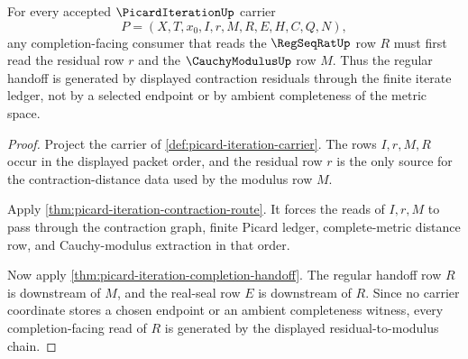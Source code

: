 \begin{theorem}
\label{thm:picard-iteration-cauchy-modulus-chain}
For every accepted $\PicardIterationUp$ carrier
$$
P=(X,T,x_0,I,r,M,R,E,H,C,Q,N),
$$
any completion-facing consumer that reads the $\RegSeqRatUp$ row $R$ must first read the residual row $r$ and the $\CauchyModulusUp$ row $M$. Thus the regular handoff is generated by displayed contraction residuals through the finite iterate ledger, not by a selected endpoint or by ambient completeness of the metric space.
\end{theorem}
\begin{proof}
Project the carrier of \autoref{def:picard-iteration-carrier}. The rows $I,r,M,R$ occur in the displayed packet order, and the residual row $r$ is the only source for the contraction-distance data used by the modulus row $M$.

Apply \autoref{thm:picard-iteration-contraction-route}. It forces the reads of $I,r,M$ to pass through the contraction graph, finite Picard ledger, complete-metric distance row, and Cauchy-modulus extraction in that order.

Now apply \autoref{thm:picard-iteration-completion-handoff}. The regular handoff row $R$ is downstream of $M$, and the real-seal row $E$ is downstream of $R$. Since no carrier coordinate stores a chosen endpoint or an ambient completeness witness, every completion-facing read of $R$ is generated by the displayed residual-to-modulus chain.
\end{proof}

